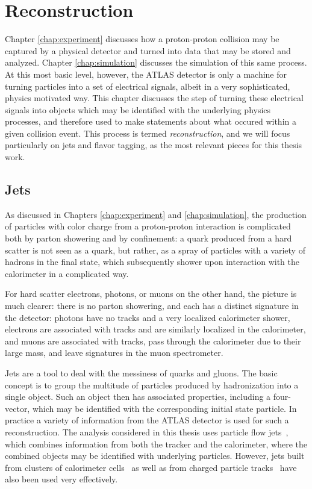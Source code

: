 \chapter{Reconstruction}
\label{chap:reconstruction}

Chapter \ref{chap:experiment} discusses how a proton-proton collision may be captured by a physical 
detector and turned into data that may be stored and analyzed. Chapter \ref{chap:simulation} discusses 
the simulation of this same process. At this most basic level, however, the ATLAS detector is only a machine 
for turning particles into a set of electrical signals, albeit in a very sophisticated, physics motivated way. 
This chapter discusses the step of turning these electrical signals into objects which may be identified 
with the underlying physics processes, and therefore used to make statements about what occured within 
a given collision event. This process is termed \emph{reconstruction}, and we will focus particularly on jets and flavor tagging, as the most relevant pieces for this thesis work.

\section{Jets}
As discussed in Chapters \ref{chap:experiment} and \ref{chap:simulation}, the production of particles with color 
charge from a proton-proton interaction is complicated both by parton showering and by confinement: a quark produced 
from a hard scatter is not seen as a quark, but rather, as a spray of particles with a variety of hadrons in the final 
state, which subsequently shower upon interaction with the calorimeter in a complicated way. 

For hard scatter electrons, photons, or muons on the other hand, the picture is much clearer: there is no parton 
showering, and each has a distinct signature in the detector: photons have no tracks and a very localized calorimeter
shower, electrons are associated with tracks and are similarly localized in the calorimeter, and muons are associated 
with tracks, pass through the calorimeter due to their large mass, and leave signatures in the muon spectrometer.

Jets are a tool to deal with the messiness of quarks and gluons. The basic concept is to group the multitude of
particles produced by hadronization into a single object. Such an object then has associated properties, 
including a four-vector, which may be identified with the corresponding initial state particle. In practice a variety 
of information from the ATLAS detector is used for such a reconstruction. The analysis considered in this thesis uses 
particle flow jets~\cite{PERF-2015-09}, which combines information from both the tracker and the calorimeter, where the 
combined objects may be identified with underlying particles. However, jets built from clusters of calorimeter cells~\cite{PERF-2014-07} as well as from charged particle tracks~\cite{ATL-PHYS-PUB-2017-010} have also been used very effectively.

